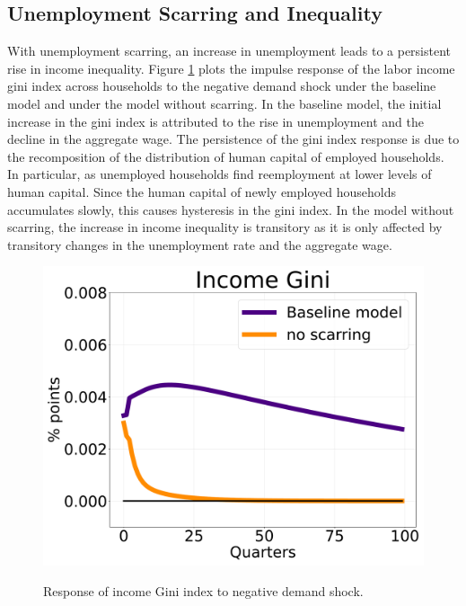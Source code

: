 \subsection{Unemployment Scarring and Inequality}

With unemployment scarring, an increase in unemployment leads to a persistent rise in income inequality. Figure \ref{Gini_IPR} plots the impulse response of the labor income gini index across households to the negative demand shock under the baseline model and under the model without scarring. In the baseline model, the initial increase in the gini index is attributed to the rise in unemployment and the decline in the aggregate wage. The persistence of the gini index response is due to the recomposition of the distribution of human capital of employed households. In particular, as unemployed households find reemployment at lower levels of human capital. Since the human capital of newly employed households accumulates slowly, this causes hysteresis in the gini index. In the model without scarring, the increase in income inequality is transitory as it is only affected by transitory changes in the unemployment rate and the aggregate wage.

\begin{figure}[!h]
   \begin{center}
   \begin{minipage}{0.7\textwidth}
        \centering
        \includegraphics[scale=.3]{text/chapter1/Figures/IPRs_discfac/gini_IPR} %
    \end{minipage}
        \caption{Response of income Gini index to negative demand shock.}
    \label{Gini_IPR}
    \end{center}
  \end{figure}




